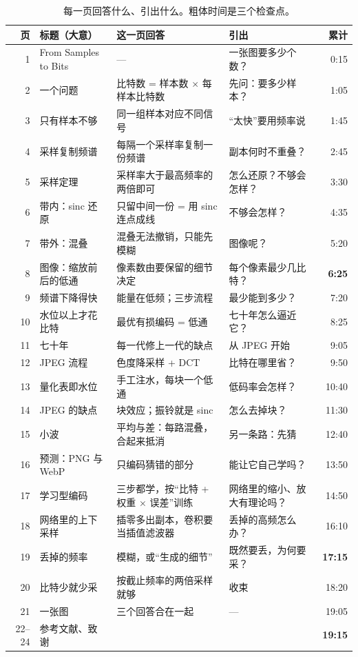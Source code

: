 \begin{table}[htbp]
\centering
\caption{每一页回答什么、引出什么。粗体时间是三个检查点。}\label{tab:chain}
\begin{tabular}{rlllr}
\toprule
页 & 标题（大意） & 这一页回答 & 引出 & 累计 \\
\midrule
1 & From Samples to Bits & — & 一张图要多少个数？ & 0:15 \\
2 & 一个问题 & 比特数 = 样本数 $\times$ 每样本比特数 & 先问：要多少样本？ & 1:05 \\
\midrule
3 & 只有样本不够 & 同一组样本对应不同信号 & “太快”要用频率说 & 1:45 \\
4 & 采样复制频谱 & 每隔一个采样率复制一份频谱 & 副本何时不重叠？ & 2:45 \\
5 & 采样定理 & 采样率大于最高频率的两倍即可 & 怎么还原？不够会怎样？ & 3:30 \\
6 & 带内：sinc 还原 & 只留中间一份 = 用 sinc 连点成线 & 不够会怎样？ & 4:35 \\
7 & 带外：混叠 & 混叠无法撤销，只能先模糊 & 图像呢？ & 5:20 \\
8 & 图像：缩放前后的低通 & 像素数由要保留的细节决定 & 每个像素最少几比特？ & \textbf{6:25} \\
\midrule
9 & 频谱下降得快 & 能量在低频；三步流程 & 最少能到多少？ & 7:20 \\
10 & 水位以上才花比特 & 最优有损编码 = 低通 & 七十年怎么逼近它？ & 8:25 \\
11 & 七十年 & 每一代修上一代的缺点 & 从 JPEG 开始 & 9:05 \\
12 & JPEG 流程 & 色度降采样 + DCT & 比特在哪里省？ & 9:50 \\
13 & 量化表即水位 & 手工注水，每块一个低通 & 低码率会怎样？ & 10:40 \\
14 & JPEG 的缺点 & 块效应；振铃就是 sinc & 怎么去掉块？ & 11:30 \\
15 & 小波 & 平均与差：每路混叠，合起来抵消 & 另一条路：先猜 & 12:40 \\
16 & 预测：PNG 与 WebP & 只编码猜错的部分 & 能让它自己学吗？ & 13:50 \\
17 & 学习型编码 & 三步都学，按“比特 + 权重 $\times$ 误差”训练 & 网络里的缩小、放大有理论吗？ & 14:50 \\
18 & 网络里的上下采样 & 插零多出副本，卷积要当插值滤波器 & 丢掉的高频怎么办？ & 16:10 \\
19 & 丢掉的频率 & 模糊，或“生成的细节” & 既然要丢，为何要采？ & \textbf{17:15} \\
\midrule
20 & 比特少就少采 & 按截止频率的两倍采样就够 & 收束 & 18:20 \\
21 & 一张图 & 三个回答合在一起 & — & 19:05 \\
22--24 & 参考文献、致谢 & & & \textbf{19:15} \\
\bottomrule
\end{tabular}
\end{table}

